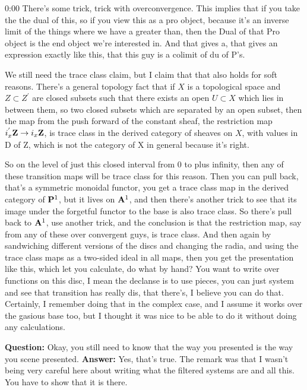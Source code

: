 \begin{unfinished}{0:00}
There's some trick, trick with overconvergence. This implies that if you take the the dual of this, so if you view this as a pro object, because it's an inverse limit of the things where we have a greater than, then the Dual of that Pro object is the end object we're interested in. And that gives a, that gives an expression exactly like this, that this guy is a colimit of du of P's. 

We still need the trace class claim, but I claim that that also holds for soft reasons.
There's a general topology fact that if $X$ is a topological space and $Z \subset Z^{'}$ are closed subsets such that there exists an open $U \subset X$ which lies in between them, so two closed subsets which are separated by an open subset, then the map from the push forward of the constant sheaf, the restriction map $i_{x}^{'} \Z \to i_{x} \Z$, is trace class in the derived category of sheaves on $X$, with values in D of Z, which is not the category of X in general because it's right.

So on the level of just this closed interval from 0 to plus infinity, then any of these transition maps will be trace class for this reason. Then you can pull back, that's a symmetric monoidal functor, you get a trace class map in the derived category of $\P^1$, but it lives on $\A^1$, and then there's another trick to see that its image under the forgetful functor to the base is also trace class. So there's pull back to $\A^1$, use another trick, and the conclusion is that the restriction map, say from any of these over convergent guys, is trace class. 
And then again by sandwiching different versions of the discs and changing the radia, and using the trace class maps as a two-sided ideal in all maps, then you get the presentation like this, which let you calculate, do what by hand? You want to write over functions on this disc, I mean the declanse  is to use pieces, you can just system and see that transition has really dis, that there's, I believe you can do that. Certainly, I remember doing that in the complex case, and I assume it works over the gasious base too, but I thought it was nice to be able to do it without doing any calculations.

\textbf{Question:} Okay, you still need to know that the way you presented is the way you scene presented. 
\textbf{Answer:} Yes, that's true. The remark was that I wasn't being very careful here about writing what the filtered systems are and all this. You have to show that it is there.


\end{unfinished}
